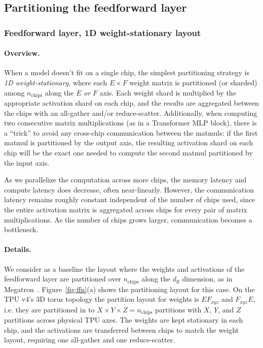 \subsection{Partitioning the feedforward layer}
\subsubsection{Feedforward layer, 1D weight-stationary layout}
\paragraph{Overview.} When a model doesn't fit on a single chip, the simplest partitioning strategy is \textit{1D weight-stationary}, where each $E \times F$ weight matrix is partitioned (or sharded) among $n_{\textrm{chips}}$ along the $E$ \textit{or} $F$ axis. Each weight shard is multiplied by the appropriate activation shard on each chip, and the results are aggregated between the chips with an all-gather and/or reduce-scatter. Additionally, when computing two consecutive matrix multiplications (as in a Transformer MLP block), there is a ``trick'' \cite{shoeybi2019megatron} to avoid any cross-chip communication between the matmuls: if the first matmul is partitioned by the output axis, the resulting activation shard on each chip will be the exact one needed to compute the second matmul partitioned by the input axis.

As we parallelize the computation across more chips, the memory latency and compute latency does decrease, often near-linearly. However, the communication latency remains roughly constant independent of the number of chips used, since the entire activation matrix is aggregated across chips for every pair of matrix multiplications. As the number of chips grows larger, communication becomes a bottleneck.

\paragraph{Details.} We consider as a baseline the layout where the weights and activations of the feedforward layer are partitioned over $n_{\textrm{chips}}$ along the $d_{\textrm{ff}}$ dimension, as in Megatron~\cite{shoeybi2019megatron}. Figure~\ref{fig:ffn}(a) shows the partitioning layout for this case. On the TPU v4's 3D torus topology the partition layout for weights is $EF_{xyz}$ and $F_{xyz}E$, i.e. they are partitioned in to $X\times Y \times Z = n_{\textrm{chips}}$ partitions with $X$, $Y$, and $Z$ partitions across physical TPU axes. The weights are kept stationary in each chip, and the activations are transferred between chips to match the weight layout, requiring one all-gather and one reduce-scatter.

